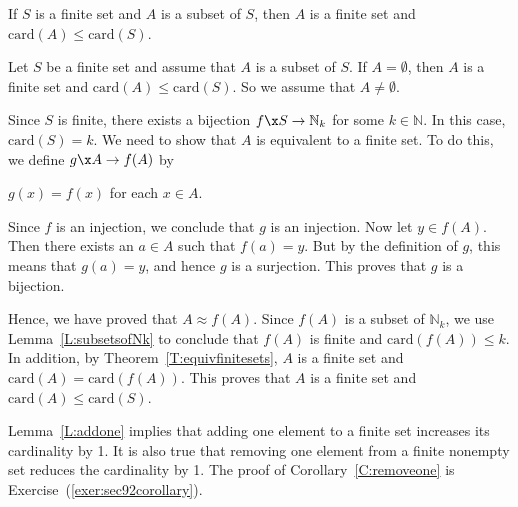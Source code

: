 \begin{theorem} \label{T:finitesubsets}
If $S$ is a finite set and $A$ is a subset of $S$, then $A$ is a finite set and 
$\text{card} ( A ) \leq \text{card} ( S )$.
\end{theorem}
%
\begin{myproof}
Let $S$ be a finite set and assume that $A$ is a subset of $S$.  If $A = \emptyset$, then $A$ is a finite set and $\text{card} ( A ) \leq \text{card} ( S )$.  So we assume that $A \ne \emptyset$.  

Since $S$ is finite, there exists a bijection $f\x S \to \mathbb{N}_k$ for some $k \in \mathbb{N}$.  In this case, $\text{card} ( S ) = k$.  We need to show that $A$ is equivalent to a finite set.  To do this, we define 
$g\x A \to f ( A )$ by
\begin{center}
$g ( x ) = f ( x )$ for each $x \in A$.
\end{center}
Since $f$ is an injection, we conclude that $g$ is an injection.  Now let 
$y \in f ( A )$.  Then there exists an $a \in A$ such that $f ( a ) = y$.  But by the definition of $g$, this means that $g ( a ) = y$, and hence $g$ is a surjection.  This proves that $g$ is a bijection.

Hence, we have proved that $A \approx f ( A )$.  Since $f ( A )$ is a subset of $\mathbb{N}_k$, we use Lemma~\ref{L:subsetsofNk} to conclude that $f ( A )$ is finite and $\text{card} ( f ( A ) ) \leq k$.  In addition, by 
Theorem~\ref{T:equivfinitesets}, $A$ is a finite set and 
$\text{card} ( A ) = \text{card} ( f ( A ) )$.  This proves that $A$ is a finite set and $\text{card} ( A ) \leq \text{card} ( S )$.
\end{myproof}
\hbreak

Lemma~\ref{L:addone} implies that adding one element to a finite set increases its cardinality by 1.  It is also true that removing one element from a finite nonempty set reduces the cardinality by 1.  The proof of Corollary~\ref{C:removeone} is 
Exercise~(\ref{exer:sec92corollary}).

